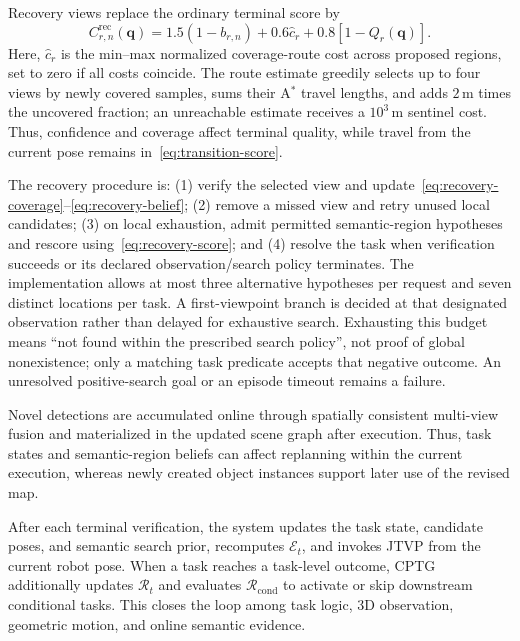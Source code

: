 \documentclass[letterpaper,10pt,journal]{IEEEtran}
\begin{document}
Recovery views replace the ordinary terminal score by
\begin{equation}
C_{r,n}^{\mathrm{rec}}(\mathbf q)=
1.5(1-b_{r,n})+0.6\widehat c_r+0.8[1-Q_r(\mathbf q)].
\label{eq:recovery-score}
\end{equation}
Here, $\widehat c_r$ is the min--max normalized coverage-route cost across proposed regions, set to zero if all costs coincide. The route estimate greedily selects up to four views by newly covered samples, sums their A$^*$ travel lengths, and adds $2\,\mathrm m$ times the uncovered fraction; an unreachable estimate receives a $10^3\,\mathrm m$ sentinel cost. Thus, confidence and coverage affect terminal quality, while travel from the current pose remains in~\eqref{eq:transition-score}.

The recovery procedure is: (1) verify the selected view and update~\eqref{eq:recovery-coverage}--\eqref{eq:recovery-belief}; (2) remove a missed view and retry unused local candidates; (3) on local exhaustion, admit permitted semantic-region hypotheses and rescore using~\eqref{eq:recovery-score}; and (4) resolve the task when verification succeeds or its declared observation/search policy terminates. The implementation allows at most three alternative hypotheses per request and seven distinct locations per task. A first-viewpoint branch is decided at that designated observation rather than delayed for exhaustive search. Exhausting this budget means ``not found within the prescribed search policy'', not proof of global nonexistence; only a matching task predicate accepts that negative outcome. An unresolved positive-search goal or an episode timeout remains a failure.

Novel detections are accumulated online through spatially consistent multi-view fusion and materialized in the updated scene graph after execution. Thus, task states and semantic-region beliefs can affect replanning within the current execution, whereas newly created object instances support later use of the revised map.

After each terminal verification, the system updates the task state, candidate poses, and semantic search prior, recomputes $\mathcal E_t$, and invokes JTVP from the current robot pose. When a task reaches a task-level outcome, CPTG additionally updates $\mathcal R_t$ and evaluates $\mathcal R_{\mathrm{cond}}$ to activate or skip downstream conditional tasks. This closes the loop among task logic, 3D observation, geometric motion, and online semantic evidence.
\end{document}
